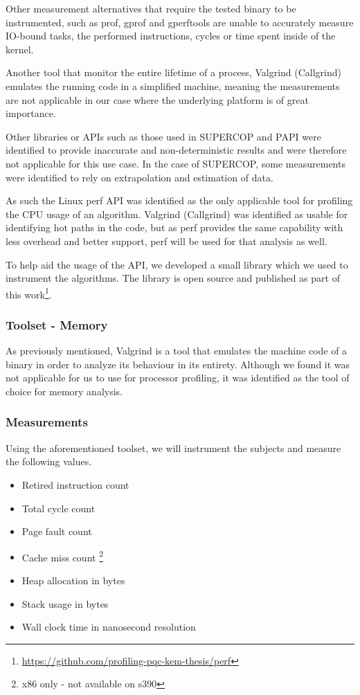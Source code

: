 Other measurement alternatives that require the tested binary to be instrumented, such as prof, gprof and gperftools are unable to accurately measure IO-bound tasks, the performed instructions, cycles or time spent inside of the kernel.

Another tool that monitor the entire lifetime of a process, Valgrind (Callgrind) emulates the running code in a simplified machine, meaning the measurements are not applicable in our case where the underlying platform is of great importance.

Other libraries or APIs such as those used in SUPERCOP and PAPI were identified to provide inaccurate and non-deterministic results and were therefore not applicable for this use case. In the case of SUPERCOP, some measurements were identified to rely on extrapolation and estimation of data.

As such the Linux perf API was identified as the only applicable tool for profiling the CPU usage of an algorithm. Valgrind (Callgrind) was identified as usable for identifying hot paths in the code, but as perf provides the same capability with less overhead and better support, perf will be used for that analysis as well.

To help aid the usage of the API, we developed a small library which we used to instrument the algorithms. The library is open source and published as part of this work\footnote{\href{https://github.com/profiling-pqc-kem-thesis/perf}{https://github.com/profiling-pqc-kem-thesis/perf}}.

\subsubsection{Toolset - Memory}

As previously mentioned, Valgrind is a tool that emulates the machine code of a binary in order to analyze its behaviour in its entirety. Although we found it was not applicable for us to use for processor profiling, it was identified as the tool of choice for memory analysis.

\subsubsection{Measurements}

Using the aforementioned toolset, we will instrument the subjects and measure the following values.

\begin{itemize}
    \item Retired instruction count
    \item Total cycle count
    \item Page fault count
    \item Cache miss count \footnote{x86 only - not available on s390}
    \item Heap allocation in bytes
    \item Stack usage in bytes
    \item Wall clock time in nanosecond resolution
\end{itemize}

